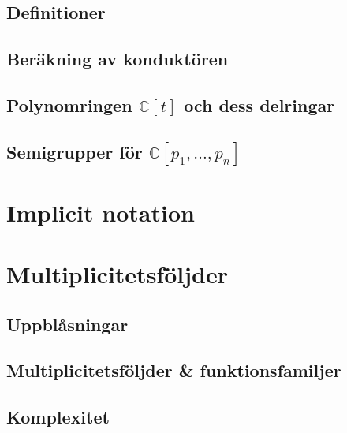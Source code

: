 \documentclass{beamer}
\begin{document}
\subsection{Definitioner}
\subsection{Beräkning av konduktören}
\subsection{Polynomringen $\mathbb{C}[t]$ och dess delringar}
\subsection{Semigrupper för $\mathbb{C}[p_1,\ldots,p_n]$}

\section{Implicit notation}

\section{Multiplicitetsföljder}
\subsection{Uppblåsningar}
\subsection{Multiplicitetsföljder \& funktionsfamiljer}
\subsection{Komplexitet}
\end{document}
